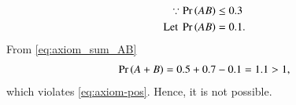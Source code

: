 \begin{align}
\because \Pr\left(AB\right) &\leq 0.3
\\
	\text{Let }
\Pr\left(AB\right) &= 0.1.
\end{align}
From \eqref{eq:axiom_sum_AB}
\begin{align}
\Pr\left(A+B\right) = 0.5+0.7-0.1 = 1.1 > 1,
\end{align}
which violates
	\eqref{eq:axiom-pos}.  Hence, it is not possible.
%


